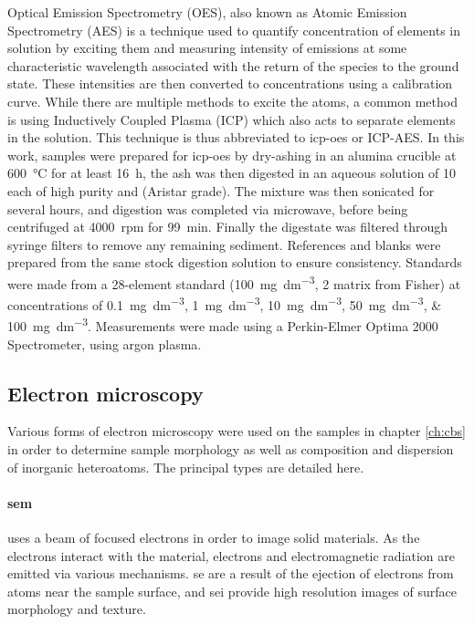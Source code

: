 Optical Emission Spectrometry (OES), also known as Atomic Emission Spectrometry (AES) is a technique used to quantify concentration of elements in solution by exciting them and measuring intensity of emissions at some characteristic wavelength associated with the return of the species to the ground state. These intensities are then converted to concentrations using a calibration curve. While there are multiple methods to excite the atoms, a common method is using Inductively Coupled Plasma (ICP) which also acts to separate elements in the solution. This technique is thus abbreviated to \acrshort{icp-oes} or ICP-AES.\citep{Hinners1988interlaboratory} In this work, samples were prepared for \acrshort{icp-oes} by dry-ashing in an alumina crucible at \qty{600}{\degreeCelsius} for at least \qty{16}{\hour}, the ash was then digested in an aqueous solution of \qty{10}{\volpercent} each of high purity  and  (Aristar grade). The mixture was then sonicated for several hours, and digestion was completed via microwave, before being centrifuged at \qty{4000}{rpm} for \qty{99}{\minute}. Finally the digestate was filtered through syringe filters to remove any remaining sediment. References and blanks were prepared from the same stock digestion solution to ensure consistency. Standards were made from a 28-element standard (\qty{100}{\mg\per\dm\cubed}, \qty{2}{\volpercent}  matrix from Fisher) at concentrations of \qtylist[list-units = single]{0.1;1;10;50;100}{\mg\per\dm\cubed}. Measurements were made using a Perkin-Elmer Optima 2000 Spectrometer, using argon plasma.

\subsection{Electron microscopy}

Various forms of electron microscopy were used on the samples in chapter \ref{ch:cbs} in order to determine sample morphology as well as composition and dispersion of inorganic heteroatoms. The principal types are detailed here.

\paragraph{\acrfull{sem}} uses a beam of focused electrons in order to image solid materials. As the electrons interact with the material, electrons and electromagnetic radiation are emitted via various mechanisms. \Acrfull{se} are a result of the ejection of electrons from atoms near the sample surface, and \acrfull{sei} provide high resolution images of surface morphology and texture.\citep{Goldstein2017Scanning} 

